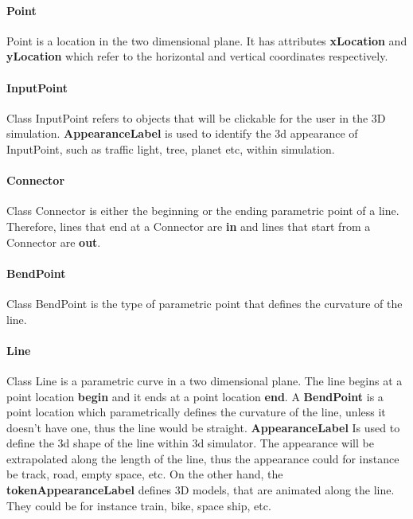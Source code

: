 \paragraph{Point}
Point is a location in the two dimensional plane. It has attributes \textbf{xLocation} and \textbf{yLocation} which refer to the horizontal and vertical coordinates respectively.

\paragraph{InputPoint}
Class InputPoint refers to objects that will be clickable for the user in the 3D simulation. \textbf{AppearanceLabel} is used to identify the 3d appearance of InputPoint, such as traffic light, tree, planet etc, within simulation.

\paragraph{Connector}
Class Connector is either the beginning or the ending parametric point of a line. Therefore, lines that end at a Connector are \textbf{in} and lines that start from a Connector are \textbf{out}.

\paragraph{BendPoint}
Class BendPoint is the type of parametric point that defines the curvature of the line.

\paragraph{Line}
Class Line is a parametric curve in a two dimensional plane. The line begins at a point location \textbf{begin} and it ends at a point location \textbf{end}. A \textbf{BendPoint} is a point location which parametrically defines the curvature of the line, unless it doesn't have one, thus the line would be straight. \textbf{AppearanceLabel} Is used to define the 3d shape of the line within 3d simulator. The appearance will be extrapolated along the length of the line, thus the appearance could for instance be track, road, empty space, etc. On the other hand, the \textbf{tokenAppearanceLabel} defines 3D models, that are animated along the line. They could be for instance train, bike, space ship, etc.
